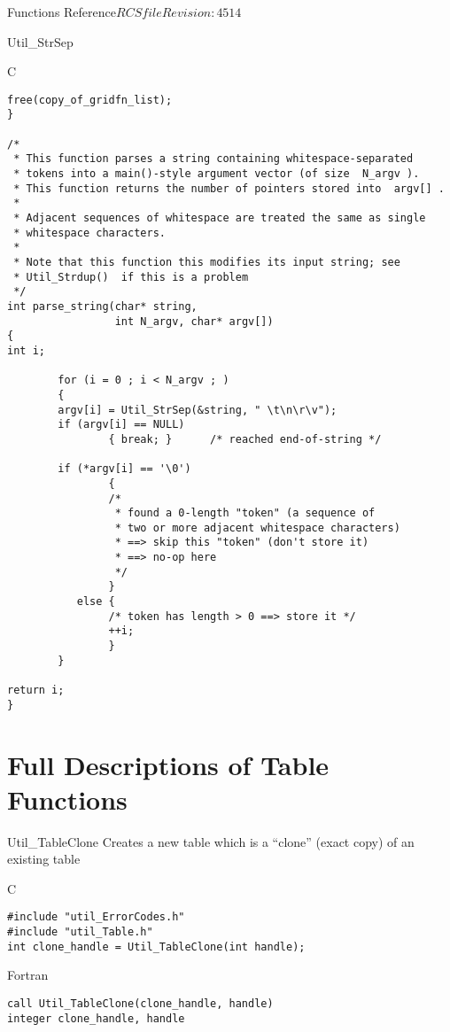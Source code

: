 \begin{cactuspart}{ Functions Reference}{$RCSfile$}{$Revision: 4514 $}
\begin{FunctionDescription}{Util\_StrSep}
\begin{ExampleSection}
\begin{Example}{C}
\begin{verbatim}
free(copy_of_gridfn_list);
}

/*
 * This function parses a string containing whitespace-separated
 * tokens into a main()-style argument vector (of size  N_argv ).
 * This function returns the number of pointers stored into  argv[] .
 *
 * Adjacent sequences of whitespace are treated the same as single
 * whitespace characters.
 *
 * Note that this function this modifies its input string; see
 * Util_Strdup()  if this is a problem
 */
int parse_string(char* string,
                 int N_argv, char* argv[])
{
int i;

        for (i = 0 ; i < N_argv ; )
        {
        argv[i] = Util_StrSep(&string, " \t\n\r\v");
        if (argv[i] == NULL)
                { break; }      /* reached end-of-string */

        if (*argv[i] == '\0')
                {
                /*
                 * found a 0-length "token" (a sequence of
                 * two or more adjacent whitespace characters)
                 * ==> skip this "token" (don't store it)
                 * ==> no-op here
                 */
                }
           else {
                /* token has length > 0 ==> store it */
                ++i;
                }
        }

return i;
}
\end{verbatim}
\end{Example}
\end{ExampleSection}
\end{FunctionDescription}


\chapter{Full Descriptions of Table Functions}


\begin{FunctionDescription}{Util\_TableClone}
\label{Util-TableClone}
Creates a new table which is a ``clone'' (exact copy) of an existing
table

\begin{SynopsisSection}
\begin{Synopsis}{C}
\begin{verbatim}
#include "util_ErrorCodes.h"
#include "util_Table.h"
int clone_handle = Util_TableClone(int handle);
\end{verbatim}
\end{Synopsis}
\begin{Synopsis}{Fortran}
\begin{verbatim}
call Util_TableClone(clone_handle, handle)
integer clone_handle, handle
\end{verbatim}
\end{Synopsis}
\end{SynopsisSection}


\end{FunctionDescription}
\end{cactuspart}
